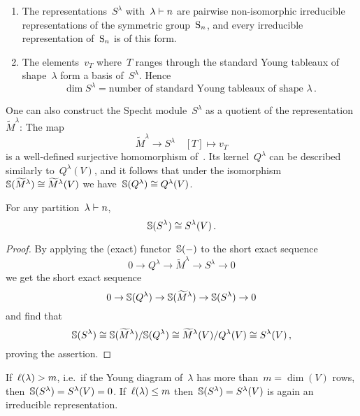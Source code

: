 \documentclass[a4paper,10pt]{scrartcl}
\begin{document}
\begin{theorem}
  \label{irreps of sn}
  \leavevmode
  \begin{enumerate}
    \item
      The representations~$S^\lambda$ with~$\lambda \vdash n$ are pairwise non-isomorphic irreducible representations of the symmetric group~$\operatorname{S}_n$, and every irreducible representation of~$\operatorname{S}_n$ is of this form.
    \item
      The elements~$v_T$ where~$T$ ranges through the standard Young tableaux of shape~$\lambda$ form a basis of~$S^\lambda$.
      Hence
      \[
        \dim S^\lambda
        =
        \text{number of standard Young tableaux of shape~$\lambda$} \,.
      \]
  \end{enumerate}
\end{theorem}

One can also construct the Specht module~$S^{\lambda}$ as a quotient of the representation~$\widetilde{M}^\lambda$:
The map
\[
  \widetilde{M}^\lambda
  \to
  S^\lambda
  \quad
  [T]
  \mapsto
  v_T
\]
is a well-defined surjective homomorphism of~{}.
Its kernel~$Q^\lambda$ can be described similarly to~$Q^\lambda(V)$, and it follows that under the isomorphism~$\mathbb{S}(\widetilde{M}^\lambda) \cong \widetilde{M}^\lambda(V)$ we have~$\mathbb{S}(Q^\lambda) \cong Q^{\lambda}(V)$.

\begin{theorem}
  For any partition~$\lambda \vdash n$,
  \[
    \mathbb{S}(S^\lambda) \cong S^{\lambda}(V) \,.
  \]
\end{theorem}

\begin{proof}
  By applying the (exact) functor~$\mathbb{S}(-)$ to the short exact sequence
  \[
    0
    \to
    Q^\lambda
    \to
    \widetilde{M}^\lambda
    \to
    S^\lambda
    \to
    0
  \]
  we get the short exact sequence
  \[
    0
    \to
    \mathbb{S}(Q^\lambda)
    \to
    \mathbb{S}(\widetilde{M}^\lambda)
    \to
    \mathbb{S}(S^\lambda)
    \to
    0
  \]
  and find that
  \[
    \mathbb{S}(S^\lambda)
    \cong
    \mathbb{S}(\widetilde{M}^\lambda)/\mathbb{S}(Q^\lambda)
    \cong
    \widetilde{M}^{\lambda}(V)/Q^{\lambda}(V)
    \cong
    S^{\lambda}(V) \,,
  \]
  proving the assertion.
\end{proof}


\begin{remark}
  \label{kernel of schur functor}
  If~$\operatorname{\ell}(\lambda) > m$, i.e.\ if the Young diagram of~$\lambda$ has more than~$m = \dim(V)$ rows, then~$\mathbb{S}(S^\lambda) = S^\lambda(V) = 0$.
  If~$\operatorname{\ell}(\lambda) \leq m$ then~$\mathbb{S}(S^\lambda) = S^\lambda(V)$ is again an irreducible representation.
\end{remark}
\end{document}
